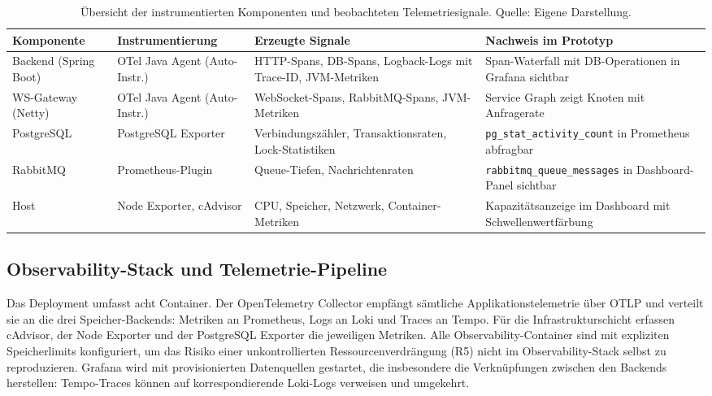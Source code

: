 \begin{table}[ht]
\centering
\caption[Übersicht der instrumentierten Komponenten und beobachteten Telemetriesignale.]{Übersicht der instrumentierten Komponenten und beobachteten Telemetriesignale. \small Quelle: Eigene Darstellung.}
\label{tab:instrumentierung-uebersicht}
\small
\begin{tabularx}{\textwidth}{
  >{\RaggedRight\arraybackslash}p{2.2cm}
  >{\RaggedRight\arraybackslash}p{3cm}
  >{\RaggedRight\arraybackslash}X
  >{\RaggedRight\arraybackslash}X
}
\toprule
\textbf{Komponente} & \textbf{Instrumentierung} & \textbf{Erzeugte Signale} & \textbf{Nachweis im Prototyp} \\
\midrule
Backend (Spring Boot) & OTel Java Agent (Auto-Instr.) & HTTP-Spans, DB-Spans, Logback-Logs mit Trace-ID, JVM-Metriken & Span-Waterfall mit DB-Operationen in Grafana sichtbar \\[4pt]
WS-Gateway (Netty) & OTel Java Agent (Auto-Instr.) & WebSocket-Spans, RabbitMQ-Spans, JVM-Metriken & Service Graph zeigt Knoten mit Anfragerate \\[4pt]
PostgreSQL & PostgreSQL Exporter & Verbindungszähler, Transaktionsraten, Lock-Statistiken & \texttt{pg\_stat\_activity\_count} in Prometheus abfragbar \\[4pt]
RabbitMQ & Prometheus-Plugin & Queue-Tiefen, Nachrichten\-raten & \texttt{rabbitmq\_queue\_messages} in Dashboard-Panel sichtbar \\[4pt]
Host & Node Exporter, cAdvisor & CPU, Speicher, Netzwerk, Container-Metriken & Kapazitätsanzeige im Dashboard mit Schwellenwertfärbung \\
\bottomrule
\end{tabularx}
\end{table}


\subsection{Observability-Stack und Telemetrie-Pipeline}

Das Deployment umfasst acht Container. Der OpenTelemetry Collector empfängt sämtliche Applikationstelemetrie über OTLP und verteilt sie an die drei Speicher-Backends: Metriken an Prometheus, Logs an Loki und Traces an Tempo. Für die Infrastrukturschicht erfassen cAdvisor, der Node Exporter und der PostgreSQL Exporter die jeweiligen Metriken. Alle Observability-Container sind mit expliziten Speicherlimits konfiguriert, um das Risiko einer unkontrollierten Ressourcenverdrängung (R5) nicht im Observability-Stack selbst zu reproduzieren. Grafana wird mit provisionierten Datenquellen gestartet, die insbesondere die Verknüpfungen zwischen den Backends herstellen: Tempo-Traces können auf korrespondierende Loki-Logs verweisen und umgekehrt.



